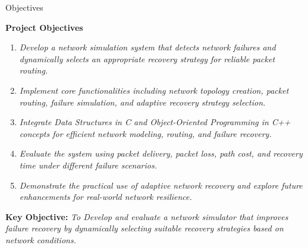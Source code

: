 \documentclass[aspectratio=169,11pt]{beamer}
\newcommand{\placeholder}[1]{\textit{\color{GEUGrey}#1}}
\begin{document}
\begin{frame}{Objectives}

\footnotesize

\textbf{\color{GEUBlue}Project Objectives}

\vspace{1mm}

\begin{enumerate}
\setlength{\itemsep}{1pt}
\setlength{\parskip}{0pt}
\setlength{\parsep}{0pt}

  \item \placeholder{Develop a network simulation system that detects network failures and dynamically selects an appropriate recovery strategy for reliable packet routing.}

  \item \placeholder{Implement core functionalities including network topology creation, packet routing, failure simulation, and adaptive recovery strategy selection.}

  \item \placeholder{Integrate Data Structures in C and Object-Oriented Programming in C++ concepts for efficient network modeling, routing, and failure recovery.}

  \item \placeholder{Evaluate the system using packet delivery, packet loss, path cost, and recovery time under different failure scenarios.}

  \item \placeholder{Demonstrate the practical use of adaptive network recovery and explore future enhancements for real-world network resilience.}

\end{enumerate}

\vspace{2mm}

\begin{center}
\colorbox{GEULightBlue}{
\parbox{.85\textwidth}{
\centering
\textbf{Key Objective:}
\placeholder{To Develop and evaluate a network simulator that improves failure recovery by dynamically selecting suitable recovery strategies based on network conditions.}
}}
\end{center}

\end{frame}
\end{document}
